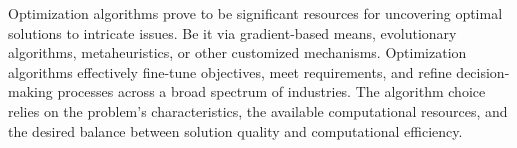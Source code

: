 Optimization algorithms prove to be significant resources for uncovering optimal solutions to intricate issues. Be it via gradient-based means, evolutionary algorithms, metaheuristics, or other customized mechanisms. Optimization algorithms effectively fine-tune objectives, meet requirements, and refine decision-making processes across a broad spectrum of industries. The algorithm choice relies on the problem's characteristics, the available computational resources, and the desired balance between solution quality and computational efficiency.

